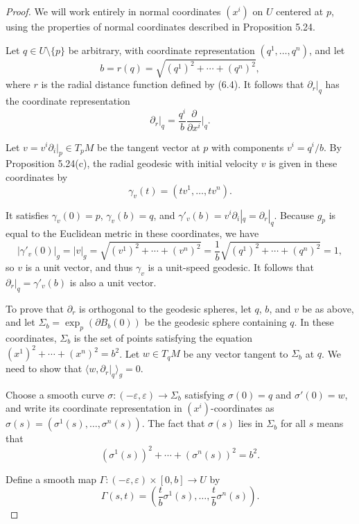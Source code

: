 \begin{proof}
We will work entirely in normal coordinates $(x^i)$ on $U$ centered at $p$, using the properties of normal coordinates described in Proposition 5.24.

Let $q \in U \setminus \{p\}$ be arbitrary, with coordinate representation $(q^1, \ldots, q^n)$, and let
\[
b = r(q) = \sqrt{(q^1)^2 + \cdots + (q^n)^2},
\]
where $r$ is the radial distance function defined by (6.4). It follows that $\partial_r|_q$ has the coordinate representation
\[
\partial_r|_q = \frac{q^i}{b} \frac{\partial}{\partial x^i}\bigg|_q.
\]

Let $v = v^i \partial_i|_p \in T_p M$ be the tangent vector at $p$ with components $v^i = q^i / b$. By Proposition 5.24(c), the radial geodesic with initial velocity $v$ is given in these coordinates by
\[
\gamma_v(t) = (tv^1, \ldots, tv^n).
\]

It satisfies $\gamma_v(0) = p$, $\gamma_v(b) = q$, and $\gamma'_v(b) = v^i \partial_i|_q = \partial_r|_q$. Because $g_p$ is equal to the Euclidean metric in these coordinates, we have
\[
|\gamma'_v(0)|_g = |v|_g = \sqrt{(v^1)^2 + \cdots + (v^n)^2} = \frac{1}{b}\sqrt{(q^1)^2 + \cdots + (q^n)^2} = 1,
\]
so $v$ is a unit vector, and thus $\gamma_v$ is a unit-speed geodesic. It follows that $\partial_r|_q = \gamma'_v(b)$ is also a unit vector.

To prove that $\partial_r$ is orthogonal to the geodesic spheres, let $q$, $b$, and $v$ be as above, and let $\Sigma_b = \exp_p(\partial B_b(0))$ be the geodesic sphere containing $q$. In these coordinates, $\Sigma_b$ is the set of points satisfying the equation $(x^1)^2 + \cdots + (x^n)^2 = b^2$. Let $w \in T_q M$ be any vector tangent to $\Sigma_b$ at $q$. We need to show that $\langle w, \partial_r|_q \rangle_g = 0$.

Choose a smooth curve $\sigma \colon (-\varepsilon, \varepsilon) \to \Sigma_b$ satisfying $\sigma(0) = q$ and $\sigma'(0) = w$, and write its coordinate representation in $(x^i)$-coordinates as $\sigma(s) = (\sigma^1(s), \ldots, \sigma^n(s))$. The fact that $\sigma(s)$ lies in $\Sigma_b$ for all $s$ means that
\begin{equation}
(\sigma^1(s))^2 + \cdots + (\sigma^n(s))^2 = b^2. \tag{6.6}
\end{equation}


Define a smooth map $\Gamma: (-\varepsilon, \varepsilon) \times [0, b] \to U$ by
\[
\Gamma(s,t) = \left( \frac{t}{b}\sigma^1(s), \ldots, \frac{t}{b}\sigma^n(s) \right).
\]


\end{proof}
